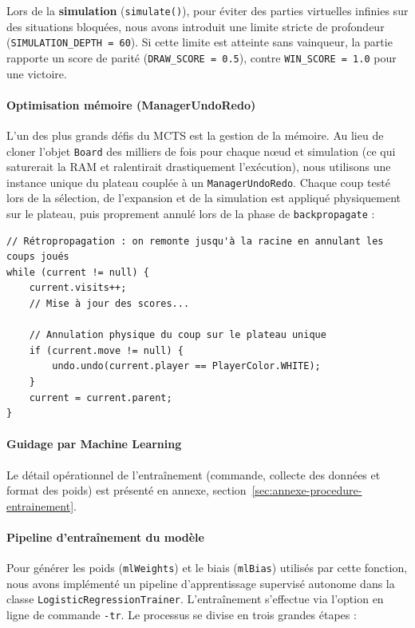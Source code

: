 \documentclass[a4paper]{article}
\begin{document}
Lors de la \textbf{simulation} (\texttt{simulate()}), pour éviter des parties virtuelles infinies sur des situations bloquées, nous avons 
introduit une limite stricte de profondeur (\texttt{SIMULATION\_DEPTH = 60}). Si cette limite est atteinte sans vainqueur, la partie rapporte 
un score de parité (\texttt{DRAW\_SCORE = 0.5}), contre \texttt{WIN\_SCORE = 1.0} pour une victoire.

\paragraph{Optimisation mémoire (ManagerUndoRedo)}
L'un des plus grands défis du MCTS est la gestion de la mémoire. Au lieu de cloner l'objet \texttt{Board} des milliers de fois pour
 chaque nœud et simulation (ce qui saturerait la RAM et ralentirait drastiquement l'exécution), nous utilisons une instance unique 
 du plateau couplée à un \texttt{ManagerUndoRedo}. Chaque coup testé lors de la sélection, de l'expansion et de la simulation est 
 appliqué physiquement sur le plateau, puis proprement annulé lors de la phase de \texttt{backpropagate} :

\begin{verbatim}
// Rétropropagation : on remonte jusqu'à la racine en annulant les coups joués
while (current != null) {
    current.visits++;
    // Mise à jour des scores...
    
    // Annulation physique du coup sur le plateau unique
    if (current.move != null) {
        undo.undo(current.player == PlayerColor.WHITE);
    }
    current = current.parent;
}
\end{verbatim}

\paragraph{Guidage par Machine Learning}

Le détail opérationnel de l'entraînement (commande, collecte des données et format des poids) est présenté en annexe, section~\ref{sec:annexe-procedure-entrainement}.

\paragraph{Pipeline d'entraînement du modèle}
Pour générer les poids (\texttt{mlWeights}) et le biais (\texttt{mlBias}) utilisés par cette fonction, nous avons implémenté un pipeline
 d'apprentissage supervisé autonome dans la classe \texttt{LogisticRegressionTrainer}. L'entraînement s'effectue via l'option en ligne de 
 commande \texttt{-tr}. Le processus se divise en trois grandes étapes :
\end{document}
